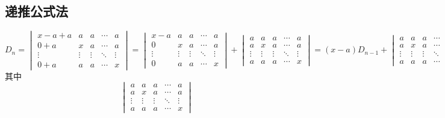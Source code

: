 \subsection{递推公式法}
\begin{solution}
    \[
        D_n =
        \begin{vmatrix}
            x - a + a & a      & a      & \cdots & a      \\
            0 + a     & x      & a      & \cdots & a      \\
            \vdots    & \vdots & \vdots & \ddots & \vdots \\
            0 + a     & a      & a      & \cdots & x
        \end{vmatrix}
        =
        \begin{vmatrix}
            x - a  & a      & a      & \cdots & a      \\
            0      & x      & a      & \cdots & a      \\
            \vdots & \vdots & \vdots & \ddots & \vdots \\
            0      & a      & a      & \cdots & x
        \end{vmatrix}
        +
        \begin{vmatrix}
            a      & a      & a      & \cdots & a      \\
            a      & x      & a      & \cdots & a      \\
            \vdots & \vdots & \vdots & \ddots & \vdots \\
            a      & a      & a      & \cdots & x
        \end{vmatrix}
        =
        (x-a)D_{n-1} +
        \begin{vmatrix}
            a      & a      & a      & \cdots & a      \\
            a      & x      & a      & \cdots & a      \\
            \vdots & \vdots & \vdots & \ddots & \vdots \\
            a      & a      & a      & \cdots & x
        \end{vmatrix}
    \]
    其中
    \[
        \begin{vmatrix}
            a      & a      & a      & \cdots & a      \\
            a      & x      & a      & \cdots & a      \\
            \vdots & \vdots & \vdots & \ddots & \vdots \\
            a      & a      & a      & \cdots & x

\end{vmatrix}\]
\end{solution}
